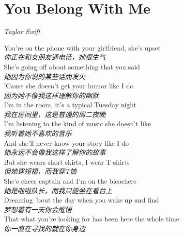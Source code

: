 \section{You Belong With Me}

\begin{center}
\textit{Taylor Swift}
\end{center}

\vspace{1em}

\begin{spacing}{1.5}
\begin{flushleft}
You're on the phone with your girlfriend, she's upset\\
\textit{你正在和女朋友通电话，她很生气}\\[0.5em]

She's going off about something that you said\\
\textit{她因为你说的某些话而发火}\\[0.5em]

'Cause she doesn't get your humor like I do\\
\textit{因为她不像我这样理解你的幽默}\\[0.5em]

I'm in the room, it's a typical Tuesday night\\
\textit{我在房间里，这是普通的周二夜晚}\\[0.5em]

I'm listening to the kind of music she doesn't like\\
\textit{我听着她不喜欢的音乐}\\[0.5em]

And she'll never know your story like I do\\
\textit{她永远不会像我这样了解你的故事}\\[0.5em]

But she wears short skirts, I wear T-shirts\\
\textit{但她穿短裙，而我穿T恤}\\[0.5em]

She's cheer captain and I'm on the bleachers\\
\textit{她是啦啦队长，而我只能坐在看台上}\\[0.5em]

Dreaming 'bout the day when you wake up and find\\
\textit{梦想着有一天你会醒悟}\\[0.5em]

That what you're looking for has been here the whole time\\
\textit{你一直在寻找的就在你身边}\\[0.5em]


\end{flushleft}
\end{spacing}
